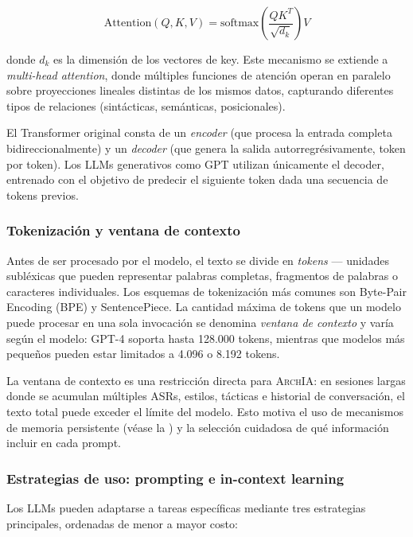 \documentclass[12pt, letterpaper, oneside]{article}
\newcommand{\archia}{\textsc{ArchIA}}
\begin{document}
\begin{equation}
\text{Attention}(Q, K, V) = \text{softmax}\left(\frac{QK^T}{\sqrt{d_k}}\right)V
\label{eq:attention}
\end{equation}

\noindent donde $d_k$ es la dimensión de los vectores de key. Este mecanismo se
extiende a \emph{multi-head attention}, donde múltiples funciones de atención
operan en paralelo sobre proyecciones lineales distintas de los mismos datos,
capturando diferentes tipos de relaciones (sintácticas, semánticas, posicionales).

El Transformer original consta de un \emph{encoder} (que procesa la entrada
completa bidireccionalmente) y un \emph{decoder} (que genera la salida
autorregrésivamente, token por token). Los LLMs generativos como GPT utilizan
únicamente el decoder, entrenado con el objetivo de predecir el siguiente token
dada una secuencia de tokens previos.

\subsubsection{Tokenización y ventana de contexto}

Antes de ser procesado por el modelo, el texto se divide en \emph{tokens} ---
unidades subléxicas que pueden representar palabras completas, fragmentos de
palabras o caracteres individuales. Los esquemas de tokenización más comunes son
Byte-Pair Encoding (BPE) y SentencePiece. La cantidad máxima de tokens que un
modelo puede procesar en una sola invocación se denomina \emph{ventana de contexto}
y varía según el modelo: GPT-4 soporta hasta 128.000 tokens, mientras que modelos
más pequeños pueden estar limitados a 4.096 o 8.192 tokens.

La ventana de contexto es una restricción directa para \archia{}: en sesiones
largas donde se acumulan múltiples ASRs, estilos, tácticas e historial de
conversación, el texto total puede exceder el límite del modelo. Esto motiva el
uso de mecanismos de memoria persistente (véase la ) y la
selección cuidadosa de qué información incluir en cada prompt.

\subsubsection{Estrategias de uso: prompting e in-context learning}

Los LLMs pueden adaptarse a tareas específicas mediante tres estrategias
principales, ordenadas de menor a mayor costo:
\end{document}
